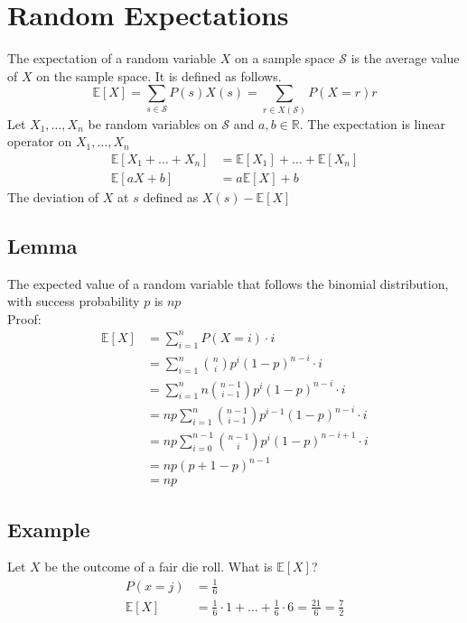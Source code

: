 \documentclass{article}
\theoremstyle{mytheoremstyle}
\theoremstyle{mytheoremstyle}
\theoremstyle{myproblemstyle}
\begin{document}
    \section*{Random Expectations}
    The expectation of a random variable $X$ on a sample space $\mathcal{S}$ is
    the average value of $X$ on the sample space. It is defined as follows.
    \[
        \mathbb{E}[X] = \sum_{s\in\mathcal{S}} P(s)X(s) = \sum_{r\in X(\mathcal{S})} P(X=r)r
    \]
    Let $X_1,\dots,X_n$ be random variables on $\mathcal{S}$ and $a,b\in
    \mathbb{R}$. The expectation is linear operator on $X_1,\dots,X_n$
    \begin{align*}
        \mathbb{E}[X_1+\dots+X_n] &= \mathbb{E}[X_1] +\dots+ \mathbb{E}[X_n] \\
        \mathbb{E}[aX+b] &= a\mathbb{E}[X] + b
    \end{align*}
    The deviation of $X$ at $s$ defined as $X(s) - \mathbb{E}[X]$

    \subsection*{Lemma}
    The expected value of a random variable that follows the binomial
    distribution, with success probability $p$ is $np$ \\
    Proof:
    \begin{align*}
        \mathbb{E}[X]
        &= \sum_{i=1}^{n} P(X=i) \cdot i \\
        &= \sum_{i=1}^{n} \binom{n}{i} p^i (1-p)^{n-i} \cdot i \\
        &= \sum_{i=1}^{n} n\binom{n-1}{i-1} p^i (1-p)^{n-i} \cdot i \\
        &= np\sum_{i=1}^{n} \binom{n-1}{i-1} p^{i-1} (1-p)^{n-i} \cdot i \\
        &= np\sum_{i=0}^{n-1} \binom{n-1}{i} p^{i} (1-p)^{n-i+1} \cdot i \\
        &= np (p+1-p)^{n-1} \\
        &= np
    \end{align*}

    \subsection*{Example}
    Let $X$ be the outcome of a fair die roll. What is $\mathbb{E}[X]$?
    \begin{align*}
        P(x=j) &= \frac{1}{6} \\
        \mathbb{E}[X] &= \frac{1}{6} \cdot 1 + \dots + \frac{1}{6} \cdot 6
        = \frac{21}{6} = \frac{7}{2}
    \end{align*}
\end{document}
